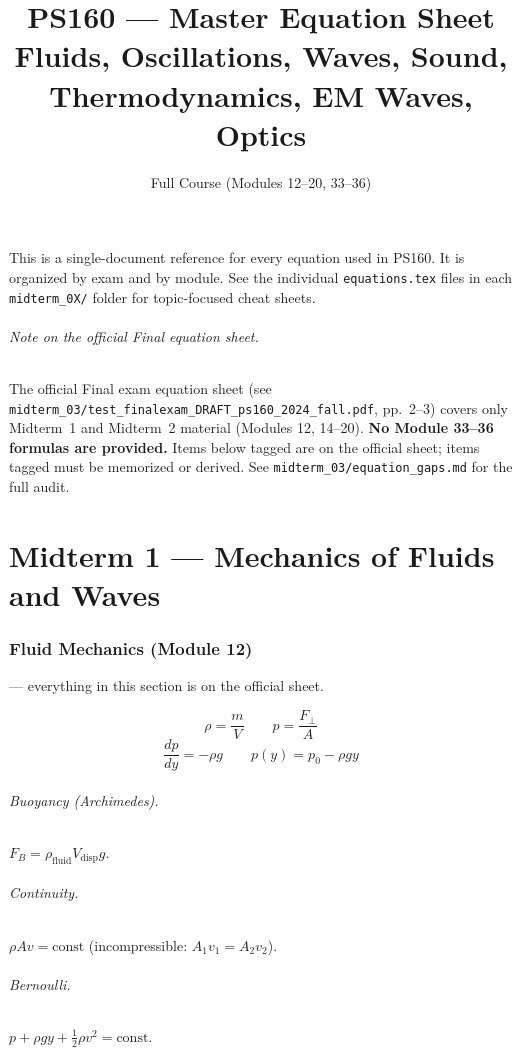 \documentclass[11pt]{article}
\title{PS160 --- Master Equation Sheet\\\large Fluids, Oscillations, Waves, Sound, Thermodynamics, EM Waves, Optics}
\author{Full Course (Modules 12--20, 33--36)}
\date{}
\begin{document}
\maketitle

\noindent This is a single-document reference for every equation used in PS160. It is organized by exam and by module. See the individual \texttt{equations.tex} files in each \texttt{midterm\_0X/} folder for topic-focused cheat sheets.

\paragraph{Note on the official Final equation sheet.}
The official Final exam equation sheet (see
\texttt{midterm\_03/test\_finalexam\_DRAFT\_ps160\_2024\_fall.pdf}, pp.\ 2--3)
covers only Midterm~1 and Midterm~2 material (Modules 12, 14--20).
\textbf{No Module 33--36 formulas are provided.} Items below tagged
 are on the official sheet; items tagged
 must be memorized or derived.
See \texttt{midterm\_03/equation\_gaps.md} for the full audit.

\tableofcontents
\newpage

\part*{Midterm 1 --- Mechanics of Fluids and Waves}

\section{Fluid Mechanics (Module 12)}
 --- everything in this section is on the official sheet.

\[
\rho = \frac{m}{V}\qquad p = \frac{F_\perp}{A}
\]
\[
\frac{dp}{dy} = -\rho g\qquad p(y) = p_0 - \rho g y
\]
\paragraph{Buoyancy (Archimedes).} $F_B = \rho_{\text{fluid}} V_{\text{disp}} g$.
\paragraph{Continuity.} $\rho A v = \text{const}$ (incompressible: $A_1 v_1 = A_2 v_2$).
\paragraph{Bernoulli.} $p + \rho g y + \tfrac{1}{2}\rho v^{2} = \text{const}$.
\end{document}
